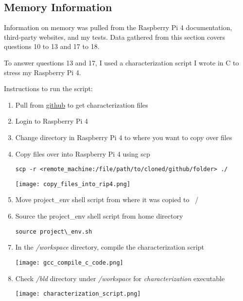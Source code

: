 \documentclass[journal]{IEEEtran}
\begin{document}
    \subsection{Memory Information}
    Information on memory was pulled from the Raspberry Pi 4 documentation, third-party websites, and my tests.
    Data gathered from this section covers questions 10 to 13 and 17 to 18.

    To answer questions 13 and 17, I used a characterization script I wrote in C to stress my Raspberry Pi 4.

    Instructions to run the script:
    \begin{enumerate}
      \item Pull from {\href{https://github.com/enriquea02/uw/tree/main/eep522a_embedded_and_real-time_systems/submissions/workspace}{github}} to get characterization files
      \item Login to Raspberry Pi 4
      \item Change directory in Raspberry Pi 4 to where you want to copy over files
      \item Copy files over into Raspberry Pi 4 using scp 
      
      \begin{lstlisting}[frame=single]
        scp -r <remote_machine:/file/path/to/cloned/github/folder> ./
      \end{lstlisting}

      \texttt{[image: copy\_files\_into\_rip4.png]}

      \item Move project\_env shell script from where it was copied to ~/
      \item Source the project\_env shell script from home directory
      
      \begin{lstlisting}[frame=single]
        source project\_env.sh
      \end{lstlisting}

      \item In the \emph{/workspace} directory, compile the characterization script
      
      \texttt{[image: gcc\_compile\_c\_code.png]}

      \item Check \emph{/bld} directory under \emph{/workspace} for \emph{characterization} executable
      
      \texttt{[image: characterization\_script.png]}
      
    \end{enumerate}
\end{document}
